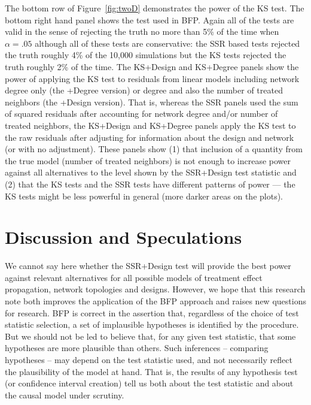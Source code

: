 The bottom row of Figure~\ref{fig:twoD} demonstrates the power of the KS test.
The bottom right hand panel shows the test used in BFP. Again all of the tests
are valid in the sense of rejecting the truth no more than 5\% of the time
when $\alpha=.05$ although all of these tests are conservative: the SSR based
tests rejected the truth roughly 4\% of the 10,000 simulations but the KS
tests rejected the truth roughly 2\% of the time.  The KS+Design and KS+Degree
panels show the power of applying the KS test to residuals from linear models
including network degree only (the +Degree version) or degree and also the
number of treated neighbors (the +Design version). That is, whereas the SSR
panels used the sum of squared residuals after accounting for network degree
and/or number of treated neighbors, the KS+Design and KS+Degree panels apply
the KS test to the raw residuals after adjusting for information about the
design and network (or with no adjustment). These panels show (1) that
inclusion of a quantity from the true model (number of treated neighbors) is
not enough to increase power against all alternatives to the level shown by
the SSR+Design test statistic and (2) that the KS tests and the SSR tests have
different patterns of power --- the KS tests might be less powerful in general
(more darker areas on the plots).

\section{Discussion and Speculations}

We cannot say here whether the SSR+Design test will provide the best power
against relevant alternatives for all possible models of treatment effect
propagation, network topologies and designs. However, we hope that this
research note both improves the application of the BFP approach and raises new
questions for research.  BFP is correct in the assertion that, regardless of
the choice of test statistic selection, a set of implausible hypotheses is
identified by the procedure. But we should not be led to believe that, for any
given test statistic, that some hypotheses are more plausible than others.
Such inferences -- comparing hypotheses -- may depend on the test statistic
used, and not necessarily reflect the plausibility of the model at hand. That
is, the results of any hypothesis test (or confidence interval creation) tell
us both about the test statistic and about the causal model under scrutiny.

